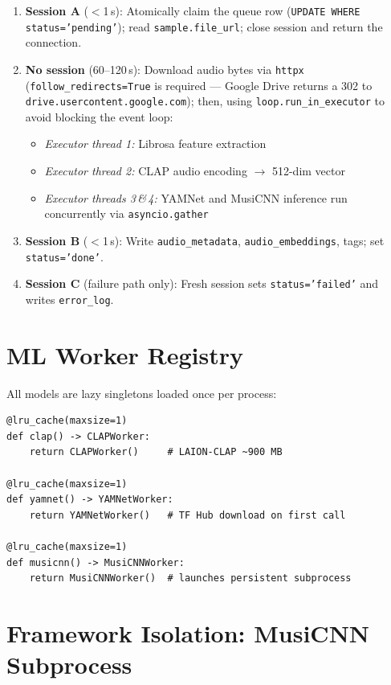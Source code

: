 \documentclass[12pt,letterpaper]{report}
\begin{document}
\begin{enumerate}
  \item \textbf{Session A} ($<$1\,s): Atomically claim the queue row (\texttt{UPDATE WHERE status='pending'}); read \texttt{sample.file\_url}; close session and return the connection.
  \item \textbf{No session} (60--120\,s): Download audio bytes via \texttt{httpx} (\texttt{follow\_redirects=True} is required --- Google Drive returns a 302 to \texttt{drive.usercontent.google.com}); then, using \texttt{loop.run\_in\_executor} to avoid blocking the event loop:
  \begin{itemize}
    \item \textit{Executor thread 1:} Librosa feature extraction
    \item \textit{Executor thread 2:} CLAP audio encoding $\to$ 512-dim vector
    \item \textit{Executor threads 3\,\&\,4:} YAMNet and MusiCNN inference run concurrently via \texttt{asyncio.gather}
  \end{itemize}
  \item \textbf{Session B} ($<$1\,s): Write \texttt{audio\_metadata}, \texttt{audio\_embeddings}, tags; set \texttt{status='done'}.
  \item \textbf{Session C} (failure path only): Fresh session sets \texttt{status='failed'} and writes \texttt{error\_log}.
\end{enumerate}

\section{ML Worker Registry}

All models are lazy singletons loaded once per process:

\begin{lstlisting}[style=pythonstyle,
  caption={Lazy ML singleton registry --- weights load exactly once},
  label={lst:registry}]
@lru_cache(maxsize=1)
def clap() -> CLAPWorker:
    return CLAPWorker()     # LAION-CLAP ~900 MB

@lru_cache(maxsize=1)
def yamnet() -> YAMNetWorker:
    return YAMNetWorker()   # TF Hub download on first call

@lru_cache(maxsize=1)
def musicnn() -> MusiCNNWorker:
    return MusiCNNWorker()  # launches persistent subprocess
\end{lstlisting}

\section{Framework Isolation: MusiCNN Subprocess}
\end{document}
